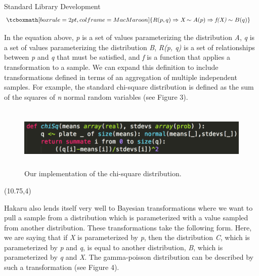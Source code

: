 \documentclass[22pt]{beamer}
\newenvironment{variableblock}[3]{%
  \setbeamercolor{block body}{#2}
  \setbeamercolor{block title}{#3}
  \begin{block}{#1}}{\end{block}}
\begin{document}
\begin{frame}[fragile]
\begin{textblock}{5}
\begin{textblock}{5}
\begin{block}{Standard Library Development}
\begin{equation*}
\begin{aligned}
& \tcboxmath[boxrule=2pt,colframe=MacMaroon]{R(p, q) \Rightarrow \textit{X} \sim A(p) \Rightarrow \textit{f(X)} \sim B(q)}
\end{aligned}
\end{equation*}

\bigskip

\tiny{In the equation above, \textit{p} is a set of values parameterizing the distribution \textit{A}}, \textit{q} is a set of values parameterizing the distribution \textit{B}, \textit{R(p, q)} is a set of relationships between \textit{p} and \textit{q} that must be satisfied, and \textit{f} is a function that applies a transformation to a sample. We can expand this definition to include transformations defined in terms of an aggregation of multiple independent samples. For example, the standard chi-square distribution is defined as the sum of the squares of \textit{n} normal random variables (see Figure 3). 

\begin{figure}
\centering
\includegraphics[height=3cm]{chi-square.png}
\caption{\tiny{Our implementation of the chi-square distribution.}}
\end{figure}

\bigskip



\end{block}

\end{textblock}

\end{textblock}


\begin{textblock}{5}(10.75,4)


\begin{variableblock}{}{}{}
\justifying

\tiny{Hakaru also lends itself very well to Bayesian transformations where we want to pull a sample from a distribution which is parameterized with a value sampled from another distribution. These transformations take the following form. Here, we are saying that if \textit{X} is parameterized by \textit{p}, then the distribution \textit{C}, which is parameterized by \textit{p} and \textit{q}, is equal to another distribution, \textit{B}, which is parameterized by \textit{q} and \textit{X}. The gamma-poisson distribution can be described by such a transformation (see Figure 4).}


\end{variableblock}
\end{textblock}
\end{frame}
\end{document}

